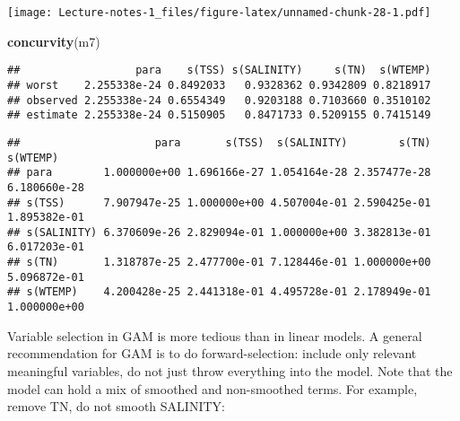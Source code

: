 \documentclass[
]{book}
\newenvironment{Shaded}{\begin{snugshade}}{\end{snugshade}}
\newcommand{\DataTypeTok}[1]{\textcolor[rgb]{0.13,0.29,0.53}{#1}}
\newcommand{\DecValTok}[1]{\textcolor[rgb]{0.00,0.00,0.81}{#1}}
\newcommand{\KeywordTok}[1]{\textcolor[rgb]{0.13,0.29,0.53}{\textbf{#1}}}
\newcommand{\NormalTok}[1]{#1}
\newcommand{\OperatorTok}[1]{\textcolor[rgb]{0.81,0.36,0.00}{\textbf{#1}}}
\newcommand{\OtherTok}[1]{\textcolor[rgb]{0.56,0.35,0.01}{#1}}
\newcommand{\StringTok}[1]{\textcolor[rgb]{0.31,0.60,0.02}{#1}}
\begin{document}
\texttt{[image: Lecture-notes-1\_files/figure-latex/unnamed-chunk-28-1.pdf]}

\begin{Shaded}
\begin{Highlighting}[]
\KeywordTok{concurvity}\NormalTok{(m7)}
\end{Highlighting}
\end{Shaded}

\begin{verbatim}
##                  para    s(TSS) s(SALINITY)     s(TN)  s(WTEMP)
## worst    2.255338e-24 0.8492033   0.9328362 0.9342809 0.8218917
## observed 2.255338e-24 0.6554349   0.9203188 0.7103660 0.3510102
## estimate 2.255338e-24 0.5150905   0.8471733 0.5209155 0.7415149
\end{verbatim}

\begin{Shaded}
\end{Shaded}

\begin{verbatim}
##                     para       s(TSS)  s(SALINITY)        s(TN)     s(WTEMP)
## para        1.000000e+00 1.696166e-27 1.054164e-28 2.357477e-28 6.180660e-28
## s(TSS)      7.907947e-25 1.000000e+00 4.507004e-01 2.590425e-01 1.895382e-01
## s(SALINITY) 6.370609e-26 2.829094e-01 1.000000e+00 3.382813e-01 6.017203e-01
## s(TN)       1.318787e-25 2.477700e-01 7.128446e-01 1.000000e+00 5.096872e-01
## s(WTEMP)    4.200428e-25 2.441318e-01 4.495728e-01 2.178949e-01 1.000000e+00
\end{verbatim}

Variable selection in GAM is more tedious than in linear models. A general recommendation for GAM is to do forward-selection: include only relevant meaningful variables, do not just throw everything into the model. Note that the model can hold a mix of smoothed and non-smoothed terms. For example, remove TN, do not smooth SALINITY:

\begin{Shaded}
\end{Shaded}
\end{document}
